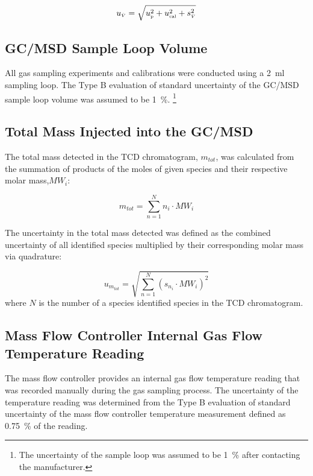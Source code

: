 \documentclass[12pt]{article}
\begin{document}
\begin{equation}
\label{eq:volumetric_flow_uncertainty}
u_{\scriptscriptstyle \dot{V}} = \sqrt{u_{\rm \scriptscriptstyle p}^2 + u_{\rm \scriptscriptstyle cal}^2 + s_{\scriptscriptstyle \dot{V}}^2}
\end{equation}

\subsection{GC/MSD Sample Loop Volume}
\label{ssec:Sample_Loop_Volume}

All gas sampling experiments and calibrations were conducted using a 2~\si{ml} sampling loop. The Type B evaluation of standard uncertainty of the GC/MSD sample loop volume was assumed to be 1~\%. \footnote{The uncertainty of the sample loop was assumed to be 1~\% after contacting the manufacturer.}

\subsection{Total Mass Injected into the GC/MSD}
\label{ssec:Total_Mass_Injected_into_GC/MSD}
The total mass detected in the TCD chromatogram, $m_{tot}$, was calculated from the summation of products of the moles of given species and their respective molar mass,${MW_{i}}$: 

\begin{equation}
\label{eq:total_mass_detected_uncertainty}
m_{tot}=\sum_{n=1}^{N}  n_{i}\cdot{MW_{i}}
\end{equation}

The uncertainty in the total mass detected was defined as the combined uncertainty of all identified species multiplied by their corresponding molar mass via quadrature:

\begin{equation}
\label{eq:total_mass_detected_uncertainty}
u_{\scriptscriptstyle m_{tot}}=\sqrt{{\sum_{n=1}^{N} (s_{\scriptscriptstyle n_{i}}\cdot{MW_{i}})^2}}
\end{equation}
where $N$ is the number of a species identified species in the TCD chromatogram. 

\subsection{Mass Flow Controller Internal Gas Flow Temperature Reading}
\label{ssec:MFC_Temp}

The mass flow controller provides an internal gas flow temperature reading that was recorded manually during the gas sampling process. The uncertainty of the temperature reading was determined from the Type B evaluation of standard uncertainty of the mass flow controller temperature measurement defined as 0.75~\% of the reading.
\end{document}
